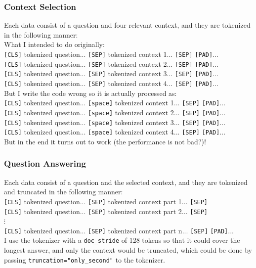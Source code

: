 \documentclass{homeworg}
\newcommand{\hug}{\emoji{hugs}\phantom{x}}
\begin{document}
\subsubsection{Context Selection}
Each data consist of a question and four relevant context, and they are tokenized in the following manner:\\
What I intended to do originally:\\\phantom{What}\texttt{[CLS]} tokenized question... \texttt{[SEP]} tokenized context 1... \texttt{[SEP]} \texttt{[PAD]}...\\
\phantom{What}\texttt{[CLS]} tokenized question... \texttt{[SEP]} tokenized context 2... \texttt{[SEP]} \texttt{[PAD]}...\\
\phantom{What}\texttt{[CLS]} tokenized question... \texttt{[SEP]} tokenized context 3... \texttt{[SEP]} \texttt{[PAD]}...\\
\phantom{What}\texttt{[CLS]} tokenized question... \texttt{[SEP]} tokenized context 4... \texttt{[SEP]} \texttt{[PAD]}...\\
But I write the code wrong so it is actually processed as:\\
\phantom{What} \texttt{[CLS]} tokenized question... \texttt{[space]} tokenized context 1... \texttt{[SEP]} \texttt{[PAD]}...\\\phantom{What}
\texttt{[CLS]} tokenized question... \texttt{[space]} tokenized context 2... \texttt{[SEP]} \texttt{[PAD]}...\\\phantom{What}
\texttt{[CLS]} tokenized question... \texttt{[space]} tokenized context 3... \texttt{[SEP]} \texttt{[PAD]}...\\\phantom{What}
\texttt{[CLS]} tokenized question... \texttt{[space]} tokenized context 4... \texttt{[SEP]} \texttt{[PAD]}...\\
But in the end it turns out to work (the performance is not bad?)!
\subsubsection{Question Answering}
Each data consist of a question and the selected context, and they are tokenized and truncated in the following manner:\\\phantom{What}
\texttt{[CLS]} tokenized question... \texttt{[SEP]} tokenized context part 1... \texttt{[SEP]}\\\phantom{What}
\texttt{[CLS]} tokenized question... \texttt{[SEP]} tokenized context part 2... \texttt{[SEP]}\\
$\vdots$\\\phantom{What}
\texttt{[CLS]} tokenized question... \texttt{[SEP]} tokenized context part n... \texttt{[SEP]} \texttt{[PAD]}...\\
I use the tokenizer with a \texttt{doc\_stride} of 128 tokens so that it could cover the longest answer, and only the context would be truncated, which could be done by passing \texttt{truncation="}{\color{red}\texttt{only\_second}}\texttt{"} to the \hug tokenizer.
\end{document}
